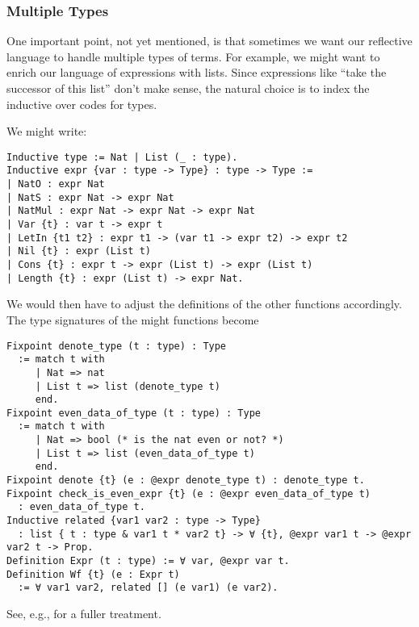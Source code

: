\subsubsection{Multiple Types} \label{sec:multiple-types-ASTs}
One important point, not yet mentioned, is that sometimes we want our reflective language to handle multiple types of terms.
For example, we might want to enrich our language of expressions with lists.
Since expressions like ``take the successor of this list'' don't make sense, the natural choice is to index the inductive over codes for types.

We might write:
\begin{verbatim}
Inductive type := Nat | List (_ : type).
Inductive expr {var : type -> Type} : type -> Type :=
| NatO : expr Nat
| NatS : expr Nat -> expr Nat
| NatMul : expr Nat -> expr Nat -> expr Nat
| Var {t} : var t -> expr t
| LetIn {t1 t2} : expr t1 -> (var t1 -> expr t2) -> expr t2
| Nil {t} : expr (List t)
| Cons {t} : expr t -> expr (List t) -> expr (List t)
| Length {t} : expr (List t) -> expr Nat.
\end{verbatim}
We would then have to adjust the definitions of the other functions accordingly.
The type signatures of the might functions become

\begin{verbatim}
Fixpoint denote_type (t : type) : Type
  := match t with
     | Nat => nat
     | List t => list (denote_type t)
     end.
Fixpoint even_data_of_type (t : type) : Type
  := match t with
     | Nat => bool (* is the nat even or not? *)
     | List t => list (even_data_of_type t)
     end.
Fixpoint denote {t} (e : @expr denote_type t) : denote_type t.
Fixpoint check_is_even_expr {t} (e : @expr even_data_of_type t)
  : even_data_of_type t.
Inductive related {var1 var2 : type -> Type}
  : list { t : type & var1 t * var2 t} -> ∀ {t}, @expr var1 t -> @expr var2 t -> Prop.
Definition Expr (t : type) := ∀ var, @expr var t.
Definition Wf {t} (e : Expr t)
  := ∀ var1 var2, related [] (e var1) (e var2).
\end{verbatim}

See, e.g., \citet{PhoasICFP08} for a fuller treatment.

